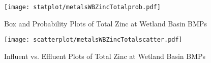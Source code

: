         \begin{figure}[hb]   %
            \centering
            \texttt{[image: statplot/metalsWBZincTotalprob.pdf]}
            \caption{Box and Probability Plots of Total Zinc at Wetland Basin BMPs}
        \end{figure}         %
        
        
        \begin{figure}[hb]   %
            \centering
            \texttt{[image: scatterplot/metalsWBZincTotalscatter.pdf]}
            \caption{Influent vs. Effluent Plots of Total Zinc at Wetland Basin BMPs}
        \end{figure}         %
        \clearpage
        
